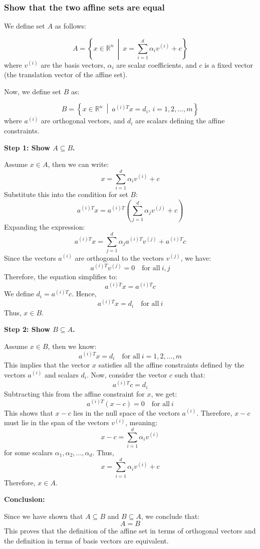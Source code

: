 \subsubsection{Show that the two affine sets are equal}
\begin{derivation}
    We define set \( A \) as follows:

    \[
    A = \left\{ x \in \mathbb{R}^n \ \middle|\ x = \sum_{i=1}^d \alpha_i v^{(i)} + c \right\}
    \]
    where \( v^{(i)} \) are the basis vectors, \( \alpha_i \) are scalar coefficients, and \( c \) is a fixed vector (the translation vector of the affine set).

    Now, we define set \( B \) as:

    \[
    B = \left\{ x \in \mathbb{R}^n \ \middle|\ a^{(i)T} x = d_i, \, i = 1, 2, \dots, m \right\}
    \]
    where \( a^{(i)} \) are orthogonal vectors, and \( d_i \) are scalars defining the affine constraints.

    \textbf{Step 1: Show \( A \subseteq B \).}

    Assume \( x \in A \), then we can write:
    \[
    x = \sum_{i=1}^d \alpha_i v^{(i)} + c
    \]
    Substitute this into the condition for set \( B \):
    \[
    a^{(i)T} x = a^{(i)T} \left( \sum_{j=1}^d \alpha_j v^{(j)} + c \right)
    \]
    Expanding the expression:
    \[
    a^{(i)T} x = \sum_{j=1}^d \alpha_j a^{(i)T} v^{(j)} + a^{(i)T} c
    \]
    Since the vectors \( a^{(i)} \) are orthogonal to the vectors \( v^{(j)} \), we have:
    \[
    a^{(i)T} v^{(j)} = 0 \quad \text{for all} \ i, j
    \]
    Therefore, the equation simplifies to:
    \[
    a^{(i)T} x = a^{(i)T} c
    \]
    We define \( d_i = a^{(i)T} c \). Hence,
    \[
    a^{(i)T} x = d_i \quad \text{for all} \ i
    \]
    Thus, \( x \in B \).

    \textbf{Step 2: Show \( B \subseteq A \).}

    Assume \( x \in B \), then we know:
    \[
    a^{(i)T} x = d_i \quad \text{for all} \ i = 1, 2, \dots, m
    \]
    This implies that the vector \( x \) satisfies all the affine constraints defined by the vectors \( a^{(i)} \) and scalars \( d_i \). Now, consider the vector \( c \) such that:
    \[
    a^{(i)T} c = d_i
    \]
    Subtracting this from the affine constraint for \( x \), we get:
    \[
    a^{(i)T} (x - c) = 0 \quad \text{for all} \ i
    \]
    This shows that \( x - c \) lies in the null space of the vectors \( a^{(i)} \). Therefore, \( x - c \) must lie in the span of the vectors \( v^{(i)} \), meaning:
    \[
    x - c = \sum_{i=1}^d \alpha_i v^{(i)}
    \]
    for some scalars \( \alpha_1, \alpha_2, \dots, \alpha_d \). Thus,
    \[
    x = \sum_{i=1}^d \alpha_i v^{(i)} + c
    \]
    Therefore, \( x \in A \).

    \textbf{Conclusion:}

    Since we have shown that \( A \subseteq B \) and \( B \subseteq A \), we conclude that:
    \[
    A = B
    \]
    This proves that the definition of the affine set in terms of orthogonal vectors and the definition in terms of basis vectors are equivalent.
\end{derivation}

